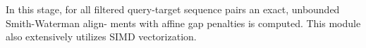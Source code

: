 In this stage, for all filtered query-target sequence pairs an exact, unbounded Smith-Waterman align-
ments with affine gap penalties is computed. This module also extensively utilizes SIMD vectorization.